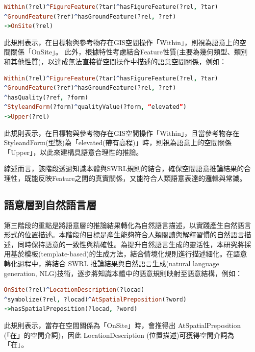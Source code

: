 \begin{lstlisting}[language=Prolog, basicstyle=\ttfamily, xleftmargin=2em]
Within(?rel)^FigureFeature(?tar)^hasFigureFeature(?rel, ?tar)
^GroundFeature(?ref)^hasGroundFeature(?rel, ?ref)
->OnSite(?rel)
\end{lstlisting}

此規則表示，在目標物與參考物存在GIS空間操作「Within」，則視為語意上的空間關係「OnSite」。
此外，根據特性考慮結合Feature性質(主要為幾何類型、類別和其他性質)，以達成無法直接從空間操作中描述的語意空間關係，例如：

\begin{lstlisting}[language=Prolog, basicstyle=\ttfamily, xleftmargin=2em]
Within(?rel)^FigureFeature(?tar)^hasFigureFeature(?rel, ?tar)
^GroundFeature(?ref)^hasGroundFeature(?rel, ?ref)
^hasQuality(?ref, ?form)
^StyleandForm(?form)^qualityValue(?form, “elevated”)
->Upper(?rel)
\end{lstlisting}

此規則表示，在目標物與參考物存在GIS空間操作「Within」，且當參考物存在StyleandForm(型態)為「elevated(帶有高程)」時，則視為語意上的空間關係「Upper」，以此來建構具語意合理性的推論。

綜述而言，該階段透過知識本體與SWRL規則的結合，確保空間語意推論結果的合理性，既能反映Feature之間的真實關係，又能符合人類語意表達的邏輯與常識。

\subsection{語意層到自然語言層}

第三階段的重點是將語意層的推論結果轉化為自然語言描述，以實踐產生自然語言形式的位置描述。本階段的目標是產生能夠符合人類閱讀與解釋習慣的自然語言描述，同時保持語意的一致性與精確性。為提升自然語言生成的靈活性，本研究將採用基於模板(template-based)的生成方法，結合情境化規則進行描述細化。在語意轉化過程中，將結合 SWRL 推論結果與自然語言生成(natural language generation, NLG)技術，逐步將知識本體中的語意規則映射至語意結構，例如：

\begin{lstlisting}[language=Prolog, basicstyle=\ttfamily, xleftmargin=2em]
OnSite(?rel)^LocationDescription(?locad)
^symbolize(?rel, ?locad)^AtSpatialPreposition(?word)
->hasSpatialPreposition(?locad, ?word)
\end{lstlisting}

此規則表示，當存在空間關係為「OnSite」時，會推得出 AtSpatialPreposition (「在」的空間介詞)，因此 LocationDescription (位置描述)可獲得空間介詞為「在」。

